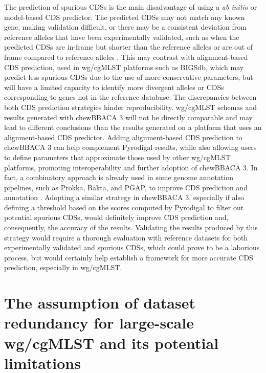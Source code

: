 The prediction of spurious \ac{CDSs} is the main disadvantage of using a \textit{ab initio} or model-based \ac{CDS} predictor. The predicted \ac{CDSs} may not match any known gene, making validation difficult, or there may be a consistent deviation from reference alleles that have been experimentally validated, such as when the predicted \ac{CDSs} are in-frame but shorter than the reference alleles or are out of frame compared to reference alleles \cite{dimonaco_no_2022}. This may contrast with alignment-based \ac{CDS} prediction, used in \ac{wg/cgMLST} platforms such as \ac{BIGSdb}, which may predict less spurious \ac{CDSs} due to the use of more conservative parameters, but will have a limited capacity to identify more divergent alleles or \ac{CDSs} corresponding to genes not in the reference database. The discrepancies between both \ac{CDS} prediction strategies hinder reproducibility. \ac{wg/cgMLST} schemas and results generated with chewBBACA 3 will not be directly comparable and may lead to different conclusions than the results generated on a platform that uses an alignment-based \ac{CDS} predictor. Adding alignment-based \ac{CDS} prediction to chewBBACA 3 can help complement Pyrodigal results, while also allowing users to define parameters that approximate those used by other \ac{wg/cgMLST} platforms, promoting interoperability and further adoption of chewBBACA 3. In fact, a combinatory approach is already used in some genome annotation pipelines, such as Prokka, Bakta, and PGAP, to improve \ac{CDS} prediction and annotation \cite{seemann_prokka_2014, schwengers_bakta_2021, li_refseq_2021}. Adopting a similar strategy in chewBBACA 3, especially if also defining a threshold based on the scores computed by Pyrodigal to filter out potential spurious \ac{CDSs}, would definitely improve \ac{CDS} prediction and, consequently, the accuracy of the results. Validating the results produced by this strategy would require a thorough evaluation with reference datasets for both experimentally validated and spurious \ac{CDSs}, which could prove to be a laborious process, but would certainly help establish a framework for more accurate \ac{CDS} prediction, especially in \ac{wg/cgMLST}.

\section{The assumption of dataset redundancy for large-scale wg/cgMLST and its potential limitations}

